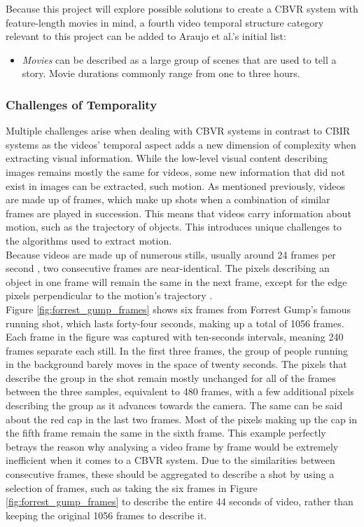 Because this project will explore possible solutions to create a CBVR system with feature-length movies in mind, a fourth video temporal structure category relevant to this project can be added to Araujo et al.'s initial list:
\begin{itemize}
    \item \textit{Movies} can be described as a large group of scenes that are used to tell a story. Movie durations commonly range from one to three hours.
\end{itemize}

\subsubsection{Challenges of Temporality}
\label{sec:litsurvey-challenges-temporality}

Multiple challenges arise when dealing with CBVR systems in contrast to CBIR systems as the videos' temporal aspect adds a new dimension of complexity when extracting visual information. While the low-level visual content describing images remains mostly the same for videos, some new information that did not exist in images can be extracted, such motion. As mentioned previously, videos are made up of frames, which make up shots when a combination of similar frames are played in succession. This means that videos carry information about motion, such as the trajectory of objects. This introduces unique challenges to the algorithms used to extract motion.\\

Because videos are made up of numerous stills, usually around 24 frames per second \cite{brownlow1980silentfilm}, two consecutive frames are near-identical. The pixels describing an object in one frame will remain the same in the next frame, except for the edge pixels perpendicular to the motion's trajectory \cite{bradski2008opencv}.\\

Figure \ref{fig:forrest_gump_frames} shows six frames from Forrest Gump's famous running shot, which lasts forty-four seconds, making up a total of 1056 frames. Each frame in the figure was captured with ten-seconds intervals, meaning 240 frames separate each still. In the first three frames, the group of people running in the background barely moves in the space of twenty seconds. The pixels that describe the group in the shot remain mostly unchanged for all of the frames between the three samples, equivalent to 480 frames, with a few additional pixels describing the group as it advances towards the camera. The same can be said about the red cap in the last two frames. Most of the pixels making up the cap in the fifth frame remain the same in the sixth frame. This example perfectly betrays the reason why analysing a video frame by frame would be extremely inefficient when it comes to a CBVR system. Due to the similarities between consecutive frames, these should be aggregated \cite{araujo2017i2v} to describe a shot by using a selection of frames, such as taking the six frames in Figure \ref{fig:forrest_gump_frames} to describe the entire 44 seconds of video, rather than keeping the original 1056 frames to describe it.

